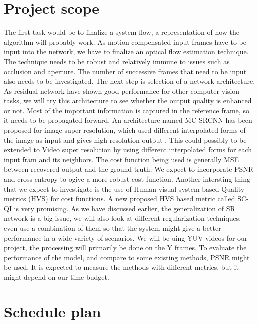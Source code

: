 \documentclass[10pt]{article}
\begin{document}
\section{Project scope} %
\label{sec:project_scope}
The first task would be to finalize a system flow, a representation of how the algorithm will probably work. As motion compensated input frames have to be input into the network, we have to finalize an optical flow estimation technique. The technique needs to be robust and relatively immune to issues such as occlusion and aperture. The number of successive frames that need to be input also needs to be investigated. The next step is selection of a network architecture. As residual network have shown good performance for other computer vision tasks, we will try this architecture to see whether the output quality is enhanced or not. Most of the important information is captured in the reference frame, so it needs to be propagated forward. An architecture named MC-SRCNN has been proposed for image super resolution, which used different interpolated forms of the image as input and gives high-resolution output \cite{youm2016image}. This could possibly to be extended to Video super resolution by using different interpolated forms for each input fram and its neighbors. The cost function being used is generally MSE between recovered output and the ground truth. We expect to incorporate PSNR and cross-entropy to ogive a more robust cost function. Another intersting thing that we expect to investigate is the use of Human visual system based Quality metrics (HVS) for cost functions. A new proposed HVS based metric called SC-QI \cite{bae2016novel} is very promising. As we have discussed earlier, the generalization of SR network is a big issue, we will also look at different regularization techniques, even use a combination of them so that the system might give a better performance in a wide variety of scenarios. We will be uing YUV videos for our project, the processing will primarily be done on the Y frames. To evaluate the performance of the model, and compare to some existing methods, PSNR might be used. It is expected to measure the methods with different metrics, but it might depend on our time budget. 

\section{Schedule plan} %
\label{sec:schedule_plane}
\end{document}

